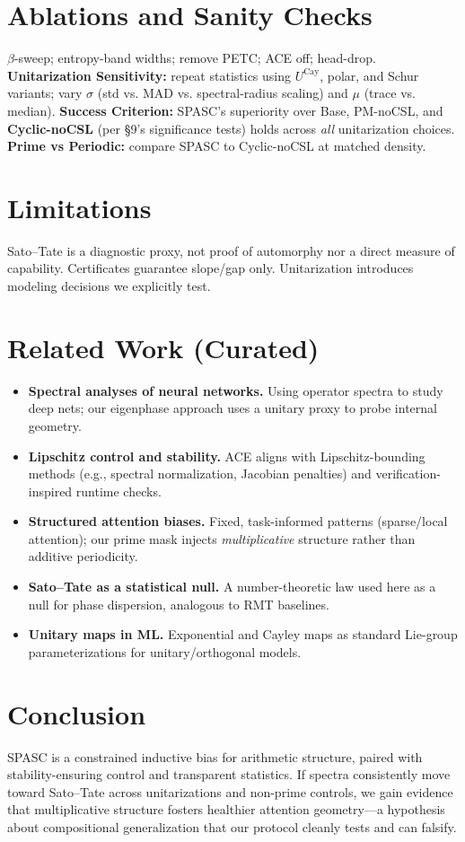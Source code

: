 \documentclass[11pt]{article}
\theoremstyle{definition}
\theoremstyle{remark}
\begin{document}
\section{Ablations and Sanity Checks}
\label{sec:ablations}
$\beta$-sweep; entropy-band widths; remove PETC; ACE off; head-drop. \textbf{Unitarization Sensitivity:} repeat statistics using $U^{\mathrm{Cay}}$, polar, and Schur variants; vary $\sigma$ (std vs. MAD vs. spectral-radius scaling) and $\mu$ (trace vs. median). \textbf{Success Criterion:} SPASC's superiority over Base, PM-noCSL, and \textbf{Cyclic-noCSL} (per \S9's significance tests) holds across \emph{all} unitarization choices. \textbf{Prime vs Periodic:} compare SPASC to Cyclic-noCSL at matched density.

\section{Limitations}
Sato--Tate is a diagnostic proxy, not proof of automorphy nor a direct measure of capability. Certificates guarantee slope/gap only. Unitarization introduces modeling decisions we explicitly test.

\section{Related Work (Curated)}
\begin{itemize}[leftmargin=*]
  \item \textbf{Spectral analyses of neural networks.} Using operator spectra to study deep nets; our eigenphase approach uses a unitary proxy to probe internal geometry.
  \item \textbf{Lipschitz control and stability.} ACE aligns with Lipschitz-bounding methods (e.g., spectral normalization, Jacobian penalties) and verification-inspired runtime checks.
  \item \textbf{Structured attention biases.} Fixed, task-informed patterns (sparse/local attention); our prime mask injects \emph{multiplicative} structure rather than additive periodicity.
  \item \textbf{Sato--Tate as a statistical null.} A number-theoretic law used here as a null for phase dispersion, analogous to RMT baselines.
  \item \textbf{Unitary maps in ML.} Exponential and Cayley maps as standard Lie-group parameterizations for unitary/orthogonal models.
\end{itemize}

\section{Conclusion}
SPASC is a constrained inductive bias for arithmetic structure, paired with stability-ensuring control and transparent statistics. If spectra consistently move toward Sato--Tate across unitarizations and non-prime controls, we gain evidence that multiplicative structure fosters healthier attention geometry---a hypothesis about compositional generalization that our protocol cleanly tests and can falsify.
\end{document}
